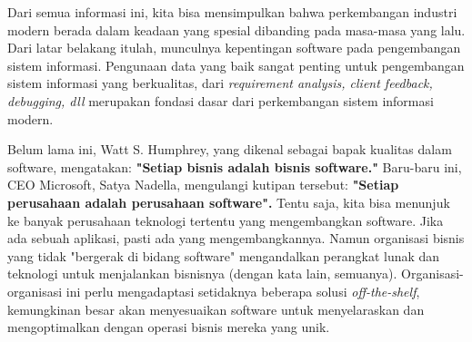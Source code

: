 Dari semua informasi ini, kita bisa mensimpulkan bahwa perkembangan industri modern berada dalam
keadaan yang spesial dibanding pada masa-masa yang lalu. Dari latar belakang itulah, munculnya
kepentingan software pada pengembangan
sistem informasi. Pengunaan data yang baik sangat penting untuk pengembangan sistem informasi yang
berkualitas, dari \emph{requirement analysis, client feedback, debugging, dll} merupakan fondasi dasar
dari perkembangan sistem informasi modern.

Belum lama ini, Watt S. Humphrey, yang dikenal sebagai bapak kualitas dalam software, mengatakan:
\textbf{"Setiap bisnis adalah bisnis software."}
Baru-baru ini, CEO Microsoft, Satya Nadella, mengulangi kutipan tersebut: 
\textbf{"Setiap perusahaan adalah perusahaan software".}
Tentu saja, kita bisa menunjuk ke banyak perusahaan teknologi tertentu yang mengembangkan software.
Jika ada sebuah aplikasi, pasti ada yang mengembangkannya.
Namun organisasi bisnis yang tidak "bergerak di bidang software" mengandalkan perangkat 
lunak dan teknologi untuk menjalankan bisnisnya (dengan kata lain, semuanya). 
Organisasi-organisasi ini perlu mengadaptasi setidaknya beberapa solusi \emph{off-the-shelf}, 
kemungkinan besar akan menyesuaikan software untuk menyelaraskan dan mengoptimalkan dengan 
operasi bisnis mereka yang unik.